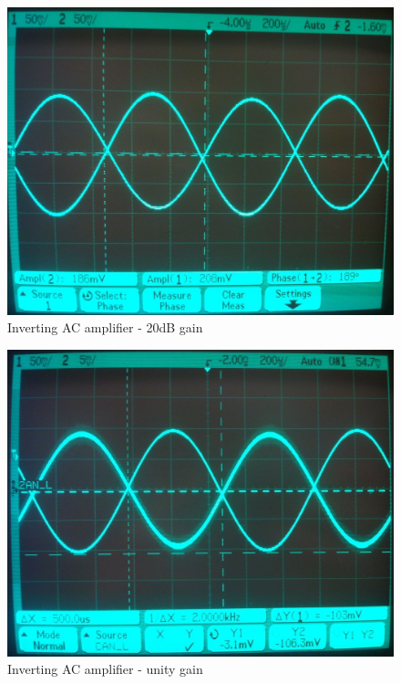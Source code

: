 \documentclass[11pt,a4paper]{article}
\begin{document}
\begin{figure}[htbp]
    \centering
    \includegraphics[scale=0.2]{img/invACamp-x10.jpg}
    \caption{Inverting AC amplifier - 20dB gain}
    \label{fig:invACamp20dB_scope}
\end{figure}

\begin{figure}[htbp]
    \centering
    \includegraphics[scale=0.2]{img/invACamp-x1.jpg}
    \caption{Inverting AC amplifier - unity gain}
    \label{fig:invACampunity_scope}
\end{figure}


\end{document}
